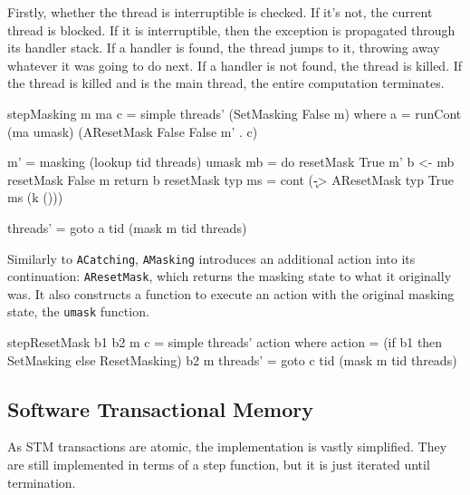 
Firstly, whether the thread is interruptible is checked. If it's not,
the current thread is blocked. If it is interruptible, then the
exception is propagated through its handler stack. If a handler is
found, the thread jumps to it, throwing away whatever it was going to
do next. If a handler is not found, the thread is killed. If the
thread is killed and is the main thread, the entire computation
terminates.

\begin{haskellcode}
stepMasking m ma c = simple threads' (SetMasking False m) where
  a = runCont (ma umask) (AResetMask False False m' . c)

  m' = masking (lookup tid threads)
  umask mb = do
    resetMask True m'
    b <- mb
    resetMask False m
    return b
  resetMask typ ms = cont (\k -> AResetMask typ True ms (k ()))

  threads' = goto a tid (mask m tid threads)
\end{haskellcode}

Similarly to \verb|ACatching|, \verb|AMasking| introduces an
additional action into its continuation: \verb|AResetMask|, which
returns the masking state to what it originally was. It also
constructs a function to execute an action with the original masking
state, the \verb|umask| function.

\begin{haskellcode}
stepResetMask b1 b2 m c = simple threads' action where
  action   = (if b1 then SetMasking else ResetMasking) b2 m
  threads' = goto c tid (mask m tid threads)
\end{haskellcode}

\subsection{Software Transactional Memory}
\label{sec:execution-stepwise-stm}

As STM transactions are atomic, the implementation is vastly
simplified. They are still implemented in terms of a step function,
but it is just iterated until termination.

